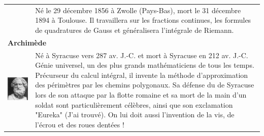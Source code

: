 \begin{tabular}{ll}
\begin{minipage}{0.2\linewidth}
\end{minipage}
& 
\begin{minipage}{0.65\linewidth}
Né le 29 décembre 1856 à Zwolle (Pays-Bas), mort le 31 décembre 1894 à Toulouse. Il travaillera sur les fractions continues, les formules de quadratures de Gauss et généralisera l'intégrale de Riemann.
\end{minipage}\\
\multicolumn{2}{l}{\textbf{Archimède}} \\[10pt]
\begin{minipage}{0.2\linewidth}
\includegraphics[scale=0.24]{images/archimede.jpg}
\end{minipage}
& 
\begin{minipage}{0.65\linewidth}
 Né à Syracuse  vers 287 av. J.-C. et mort à Syracuse en 212 av. J.-C. Génie universel, un des plus grands mathématiciens de tous les temps. Précurseur du calcul intégral, il invente la méthode d'approximation des périmètres par les chemins polygonaux. Sa défense du de Syracuse lors de son attaque par la flotte romaine et sa mort de la main d'un soldat sont particulièrement célèbres, ainsi que son exclamation "Eureka" (J'ai trouvé). On lui doit aussi l'invention de la vis, de l'écrou  et des roues dentées !
\end{minipage}\\
\end{tabular}

